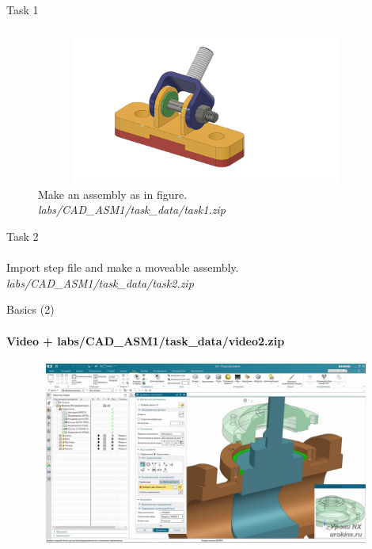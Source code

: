 \documentclass[aspectratio=169]{beamer}
\newcommand{\fbckg}[1]{\usebackgroundtemplate{\texttt{[image: \#1]}}}%
\begin{document}
\begin{frame}[t]{Task 1}
\framesubtitle{}
    \begin{figure}[H]
        \centering\includegraphics[height=5cm,width=1\textwidth,keepaspectratio]{task1.png}
        \caption*{Make an assembly as in figure. \textit{labs/CAD\_ASM1/task\_data/task1.zip}}
        \label{fig:task1.png}
    \end{figure}
\end{frame}

\begin{frame}[t]{Task 2}
    \framesubtitle{}
        Import step file and make a moveable assembly.\textit{ labs/CAD\_ASM1/task\_data/task2.zip}
    \end{frame}

    \begin{frame}[t]{Basics (2)}
        \framesubtitle{Video + labs/CAD\_ASM1/task\_data/video2.zip}
        \vspace{-0.6cm}
        \begin{figure}[H]
            \href{https://disk.yandex.ru/i/kbz5Hqkpsvte8w}{
                \centering\includegraphics[height=6cm,width=1\textwidth,keepaspectratio]{2.png}}
            \label{fig:2}
        \end{figure}
    \end{frame}

\fbckg{fibeamer/figs/last_page.png}
\frame[plain]{}
\end{document}

